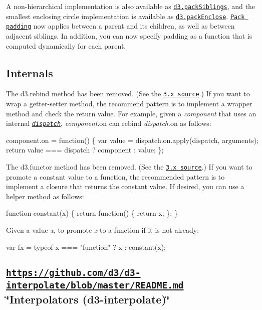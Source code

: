 A non-\/hierarchical implementation is also available as \href{https://github.com/d3/d3-hierarchy/blob/master/README.md#packSiblings}{\tt d3.\+pack\+Siblings}, and the smallest enclosing circle implementation is available as \href{https://github.com/d3/d3-hierarchy/blob/master/README.md#packEnclose}{\tt d3.\+pack\+Enclose}. \href{https://github.com/d3/d3-hierarchy/blob/master/README.md#pack_padding}{\tt Pack padding} now applies between a parent and its children, as well as between adjacent siblings. In addition, you can now specify padding as a function that is computed dynamically for each parent.

\subsection*{Internals}

The d3.\+rebind method has been removed. (See the \href{https://github.com/d3/d3/blob/v3.5.17/src/core/rebind.js}{\tt 3.\+x source}.) If you want to wrap a getter-\/setter method, the recommend pattern is to implement a wrapper method and check the return value. For example, given a {\itshape component} that uses an internal \href{#dispatches-d3-dispatch}{\tt {\itshape dispatch}}, {\itshape component}.on can rebind {\itshape dispatch}.on as follows\+:


\begin{DoxyCode}
component.on = function() \{
  var value = dispatch.on.apply(dispatch, arguments);
  return value === dispatch ? component : value;
\};
\end{DoxyCode}


The d3.\+functor method has been removed. (See the \href{https://github.com/d3/d3/blob/v3.5.17/src/core/functor.js}{\tt 3.\+x source}.) If you want to promote a constant value to a function, the recommended pattern is to implement a closure that returns the constant value. If desired, you can use a helper method as follows\+:


\begin{DoxyCode}
function constant(x) \{
  return function() \{
    return x;
  \};
\}
\end{DoxyCode}


Given a value {\itshape x}, to promote {\itshape x} to a function if it is not already\+:


\begin{DoxyCode}
var fx = typeof x === "function" ? x : constant(x);
\end{DoxyCode}


\subsection*{\href{https://github.com/d3/d3-interpolate/blob/master/README.md}{\tt https\+://github.\+com/d3/d3-\/interpolate/blob/master/\+R\+E\+A\+D\+M\+E.\+md} \char`\"{}\+Interpolators (d3-\/interpolate)\char`\"{}}

